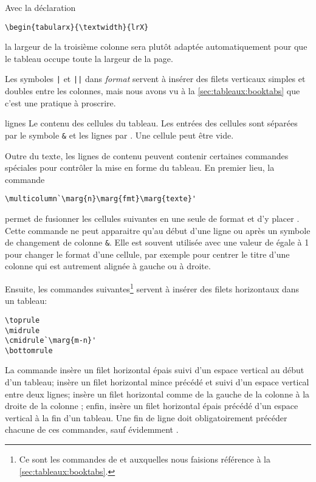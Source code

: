 \begin{list}{}
  Avec la déclaration
\begin{lstlisting}
\begin{tabularx}{\textwidth}{lrX}
\end{lstlisting}
  la largeur de la troisième colonne sera plutôt adaptée
  automatiquement pour que le tableau occupe toute la largeur de la
  page.

  Les symboles \verb=|= et \verb=||= dans \textit{format} servent à
  insérer des filets verticaux simples et doubles entre les colonnes,
  mais nous avons vu à la \autoref{sec:tableaux:booktabs} que c'est
  une pratique à proscrire.
\item[lignes] Le contenu des cellules du tableau. Les entrées des
  cellules sont séparées par le symbole \verb=&= et les lignes par
  {\pixbsbs}. Une cellule peut être vide.
\end{list}

Outre du texte, les lignes de contenu peuvent contenir certaines
commandes spéciales pour contrôler la mise en forme du tableau. En
premier lieu, la commande
\begin{lstlisting}
\multicolumn`\marg{n}\marg{fmt}\marg{texte}'
\end{lstlisting}
permet de fusionner les  cellules suivantes en une seule de
format  et d'y placer . Cette commande ne peut
apparaitre qu'au début d'une ligne ou après un symbole de changement
de colonne \verb=&=. Elle est souvent utilisée avec une valeur de
 égale à 1 pour changer le format d'une cellule, par exemple
pour centrer le titre d'une colonne qui est autrement alignée à gauche
ou à droite.

Ensuite, les commandes suivantes\footnote{%
  Ce sont les commandes de  et  auxquelles
  nous faisions référence à la \autoref{sec:tableaux:booktabs}.} %
servent à insérer des filets horizontaux dans un tableau:
\begin{lstlisting}
\toprule
\midrule
\cmidrule`\marg{m-n}'
\bottomrule
\end{lstlisting}
La commande \cmd{\toprule} insère un filet horizontal épais suivi d'un
espace vertical au début d'un tableau; \cmd{\midrule} insère un filet
horizontal mince précédé et suivi d'un espace vertical entre deux
lignes; \cmd{\cmidrule} insère un filet horizontal comme
\cmdprint{\midrule} de la gauche de la colonne  à la droite de
la colonne ; enfin, \cmd{\bottomrule} insère un filet
horizontal épais précédé d'un espace vertical à la fin d'un tableau.
Une fin de ligne {\bs\bs} doit obligatoirement précéder chacune de ces
commandes, sauf évidemment \cmdprint{\toprule}.

